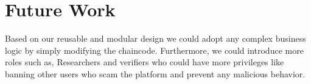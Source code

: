 \section{Future Work} 

Based on our reusable and modular design we could adopt any complex business logic by simply modifying the chaincode. Furthermore, we could introduce more roles such as, Researchers and verifiers who could have more privileges like banning other users who scam the platform and prevent any malicious behavior. 
 
